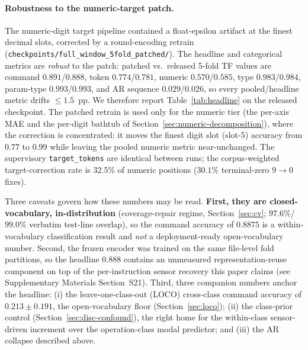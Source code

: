 \documentclass[sensors,article,submit,moreauthors,pdftex]{Definitions/mdpi}
\begin{document}
\paragraph{Robustness to the numeric-target patch.} The numeric-digit target pipeline contained a float-epsilon artifact at the finest decimal slots, corrected by a round-encoding retrain (\texttt{checkpoints/full\_window\_5fold\_patched/}). The headline and categorical metrics are \emph{robust} to the patch: patched vs.\ released 5-fold TF values are command $0.891$/$0.888$, token $0.774$/$0.781$, numeric $0.570$/$0.585$, type $0.983$/$0.984$, param-type $0.993$/$0.993$, and AR sequence $0.029$/$0.026$, so every pooled/headline metric drifts $\le\!1.5$~pp. We therefore report Table~\ref{tab:headline} on the released checkpoint. The patched retrain is used only for the numeric tier (the per-axis MAE and the per-digit bathtub of Section~\ref{sec:numeric-decomposition}), where the correction is concentrated: it moves the finest digit slot (slot-5) accuracy from $0.77$ to $0.99$ while leaving the pooled numeric metric near-unchanged. The supervisory \texttt{target\_tokens} are identical between runs; the corpus-weighted target-correction rate is $32.5\%$ of numeric positions ($30.1\%$ terminal-zero $9\!\to\!0$ fixes).

Three caveats govern how these numbers may be read. \textbf{First, they are closed-vocabulary, in-distribution} (coverage-repair regime, Section~\ref{sec:cv}; $97.6\%$/$99.0\%$ verbatim test-line overlap), so the command accuracy of $0.8875$ is a within-vocabulary classification result and \emph{not} a deployment-ready open-vocabulary number. Second, the frozen encoder was trained on the same file-level fold partitions, so the headline $0.888$ contains an unmeasured representation-reuse component on top of the per-instruction sensor recovery this paper claims (see Supplementary Materials Section~S21). Third, three companion numbers anchor the headline: (i) the leave-one-class-out (LOCO) cross-class command accuracy of $0.213 \pm 0.191$, the open-vocabulary floor (Section~\ref{sec:loco}); (ii) the class-prior control (Section~\ref{sec:disc-confound}), the right home for the within-class sensor-driven increment over the operation-class modal predictor; and (iii) the AR collapse described above.


\end{document}
